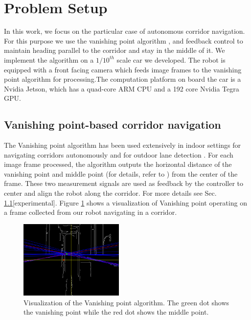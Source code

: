 \section{Problem Setup}
\label{sec:problemSetup}
In this work, we focus on the particular case of autonomous corridor navigation. For this purpose we use the vanishing point algorithm \cite{VP1}, \cite{VP2} and feedback control to maintain heading parallel to the corridor and stay in the middle of it. We implement the algorithm on a $1/10^{th}$ scale car we developed. The robot is equipped with a front facing camera which feeds image frames to the vanishing point algorithm for processing.The computation platform on board the car is a Nvidia Jetson, which has a quad-core ARM CPU and a 192 core Nvidia Tegra GPU.


\subsection{Vanishing point-based corridor navigation}

The Vanishing point algorithm \cite{VP1} has been used extensively in indoor settings for navigating corridors autonomously \cite{VP2, VP3} and for outdoor lane detection \cite{gallagher2002ground}.
For each image frame processed, the algorithm outputs the horizontal distance of the vanishing point and middle point (for details, refer to \cite{VP1}) from the center of the frame. These two measurement signals are used as feedback by the controller to center and align the robot along the corridor. For more details see Sec. \ref{}[experimental]. Figure \ref{fig:vp_viz} shows a visualization of Vanishing point operating on a frame collected from our robot navigating in a corridor.

\begin{figure}[hbtp]
\centering
\includegraphics[width=0.46\textwidth]{Figs/vpmpimages/image_23_-30_-51.png}
\caption{Visualization of the Vanishing point algorithm. The green dot shows the vanishing point while the red dot shows the middle point.}
\label{fig:vp_viz} %
\end{figure}


